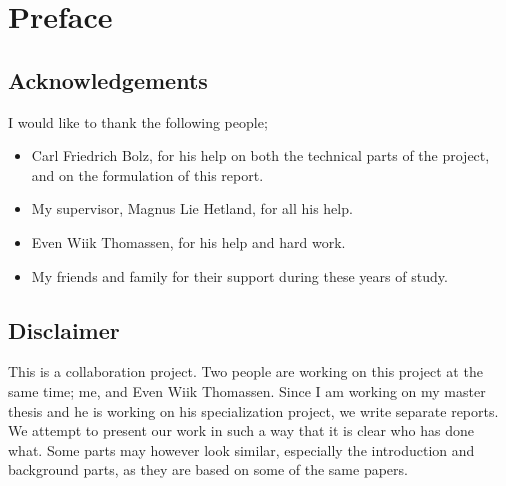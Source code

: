 
\chapter*{Preface}

\section*{Acknowledgements}

I would like to thank the following people;

\begin{itemize}

\item Carl Friedrich Bolz, for his help on both the technical parts
of the project, and on the formulation of this report.

\item My supervisor, Magnus Lie Hetland, for all his help.

\item Even Wiik Thomassen, for his help and hard work.

\item My friends and family for their support during these years of study.

\end{itemize}


\section*{Disclaimer}

This is a collaboration project. Two people are working on this
project at the same time; me, and Even Wiik Thomassen. Since I am working
on my master thesis and he is working on his specialization project, we 
write separate reports. We attempt to present our work in such a way that
it is clear who has done what. Some parts may however look similar,
especially the introduction and background parts, as they are based on 
some of the same papers.


